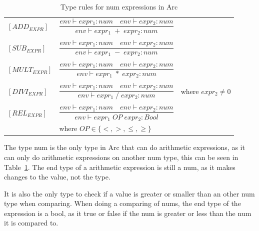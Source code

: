 \begin{table}[htb!]
    \centering
    \begin{tabular}{lll}
        \toprule
        $[ADD_{EXPR}] $                         & $\dfrac
            {env\vdash expr_1: num \quad env\vdash expr_2: num}
            {env\vdash expr_1 \;+\;expr_2: num}$
        \\
        \\
        $[SUB_{EXPR}] $                         & $\dfrac
            {env\vdash expr_1: num \quad env\vdash expr_2: num}
            {env\vdash expr_1 \;-\;expr_2: num}$
        \\
        \\
        $[MULT_{EXPR}] $                        & $\dfrac
            {env\vdash expr_1: num \quad env\vdash expr_2: num}
            {env\vdash expr_1 \;*\;expr_2: num}$
        \\
        \\
        $[DIVI_{EXPR}] $                        & $\dfrac
            {env\vdash expr_1: num \quad env\vdash expr_2: num}
        {env\vdash expr_1 \; / \; expr_2: num}$ & where $expr_2 \neq 0$
        \\
        \\
        $[REL_{EXPR}] $                         & $\dfrac
            {env\vdash expr_1: num \quad env\vdash expr_2: num}
            {env\vdash expr_1 \; OP \; expr_2: Bool}$                                 \\

                                                & where $OP \in \{<, >, \leq, \geq\}$

        \\
        \bottomrule
    \end{tabular}
    \caption{Type rules for num expressions in Arc}
    \label{tab:num-rules}
\end{table}


The type num is the only type in Arc that can do arithmetic expressions, as it can only do arithmetic expressions on another num type, this can be seen in Table~\ref{tab:num-rules}. The end type of a arithmetic expression is still a num, as it makes changes to the value, not the type.

It is also the only type to check if a value is greater or smaller than an other num type when comparing. When doing a comparing of nums, the end type of the expression is a bool, as it true or false if the num is greater or less than the num it is compared to.


